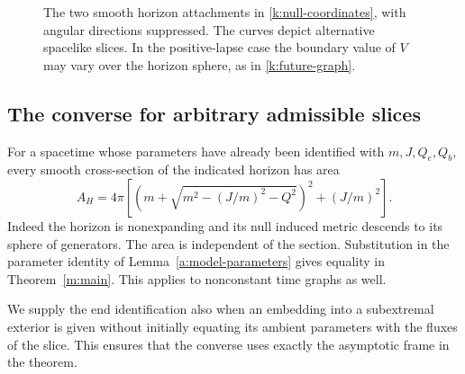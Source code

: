 \begin{figure}[htbp]
 \centering
 \caption{The two smooth horizon attachments in
 \eqref{k:null-coordinates}, with angular directions suppressed.
 The curves depict alternative spacelike slices. In the
 positive-lapse case the boundary value of \(V\) may vary over
 the horizon sphere, as in \eqref{k:future-graph}.}
 \label{k:horizon-figure}
\end{figure}

\subsection{The converse for arbitrary admissible slices}

For a \KN{} spacetime whose parameters have already been
identified with \(m,J,Q_e,Q_b\), every smooth cross-section of
the indicated horizon has area
\begin{equation}\label{k:horizon-area}
 A_H=4\pi\left[
 \left(m+\sqrt{m^2-(J/m)^2-Q^2}\right)^2+(J/m)^2\right].
\end{equation}
Indeed the horizon is nonexpanding and its null induced metric
descends to its sphere of generators. The area is independent
of the section. Substitution in the parameter identity of
Lemma~\ref{a:model-parameters} gives equality in Theorem~\ref{m:main}.
This applies to nonconstant time graphs as well.

We supply the end identification also when an embedding into a
subextremal \KN{} exterior is given without initially equating
its ambient parameters with the fluxes of the slice. This
ensures that the converse uses exactly the asymptotic frame in
the theorem.

